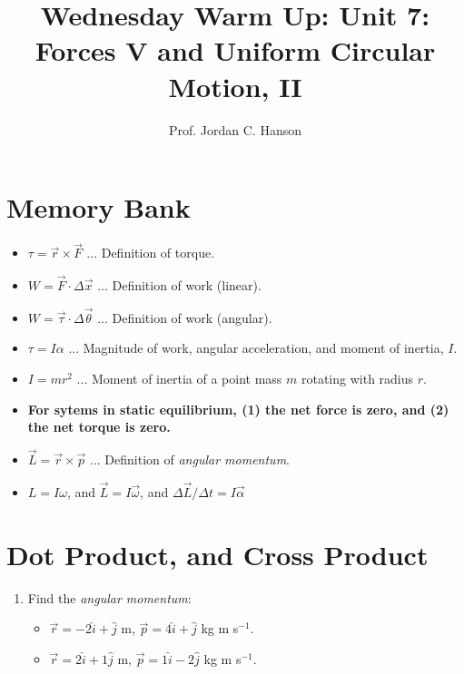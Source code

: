 \documentclass{article}
\begin{document}
\twocolumn

\title{Wednesday Warm Up: Unit 7: Forces V and Uniform Circular Motion, II}
\author{Prof. Jordan C. Hanson}

\maketitle

\section{Memory Bank}

\begin{itemize}
\item $\tau = \vec{r} \times \vec{F}$ ... Definition of torque.
\item $W = \vec{F} \cdot \Delta \vec{x}$ ... Definition of work (linear).
\item $W = \vec{\tau} \cdot \Delta \vec{\theta}$ ... Definition of work (angular).
\item $\tau = I\alpha$ ... Magnitude of work, angular acceleration, and moment of inertia, $I$.
\item $I = mr^2$ ... Moment of inertia of a point mass $m$ rotating with radius $r$.
\item \textbf{For sytems in static equilibrium, (1) the net force is zero, and (2) the net torque is zero.}
\item $\vec{L} = \vec{r} \times \vec{p}$ ... Definition of \textit{angular momentum}.
\item $L = I\omega$, and $\vec{L} = I\vec{\omega}$, and $\Delta \vec{L} / \Delta t = I\vec{\alpha}$
\end{itemize}

\section{Dot Product, and Cross Product}

\begin{enumerate}
\item Find the \textit{angular momentum}:
\begin{itemize}
\item $\vec{r} = -2\hat{i} + \hat{j}$ m, $\vec{p} = 4\hat{i} + \hat{j}$ kg m s$^{-1}$.
\item $\vec{r} = 2\hat{i} + 1\hat{j}$ m, $\vec{p} = 1\hat{i} - 2\hat{j}$ kg m s$^{-1}$.
\end{itemize}
\vspace{1.5cm}
\end{enumerate}
\end{document}
